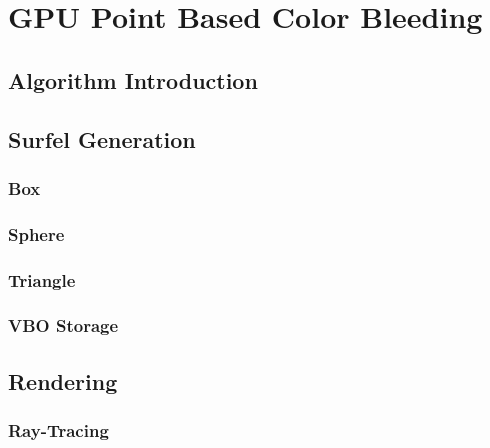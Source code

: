 \chapter{GPU Point Based Color Bleeding}

\section{Algorithm Introduction}

\section{Surfel Generation}

\subsection{Box}

\subsection{Sphere}

\subsection{Triangle}

\subsection{VBO Storage}

\section{Rendering}

\subsection{Ray-Tracing}

